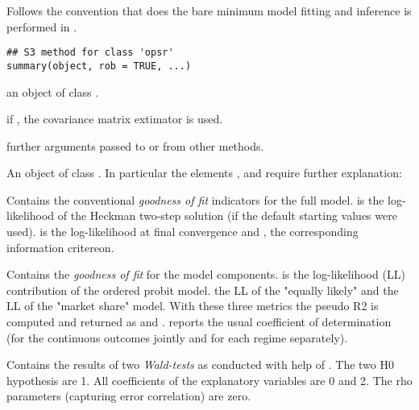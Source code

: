 %
\begin{Description}
Follows the convention that  does the bare minimum model fitting and
inference is performed in .
\end{Description}
%
\begin{Usage}
\begin{verbatim}
## S3 method for class 'opsr'
summary(object, rob = TRUE, ...)
\end{verbatim}
\end{Usage}
%
\begin{Arguments}
\begin{ldescription}
\item[\code{object}] an object of class .

\item[\code{rob}] if , the  covariance matrix extimator is used.

\item[\code{...}] further arguments passed to or from other methods.
\end{ldescription}
\end{Arguments}
%
\begin{Value}
An object of class .
In particular the elements ,  and  require further
explanation:
\begin{ldescription}
\item[\code{GOF}] Contains the conventional \emph{goodness of fit} indicators for the full
model.  is the log-likelihood of the Heckman two-step solution (if
the default starting values were used).  is the log-likelihood at
final convergence and ,  the corresponding information critereon.
\item[\code{GOFcomponents}] Contains the \emph{goodness of fit}  for the model components.
 is the log-likelihood (LL) contribution of the ordered probit model.
 the LL of the "equally likely" and  the LL of the
"market share" model. With these three metrics the pseudo R2 is computed and
returned as  and .  reports the usual coefficient
of determination (for the continuous outcomes jointly and for each regime
separately).
\item[\code{wald}] Contains the results of two \emph{Wald-tests} as conducted with help
of . The two H0 hypothesis are 1. All coefficients
of the explanatory variables are 0 and 2. The rho parameters (capturing error
correlation) are zero.
\end{ldescription}
\end{Value}


